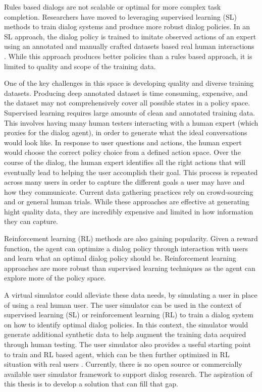 Rules based dialogs are not scalable or optimal for more complex task completion. Researchers have moved to leveraging supervised learning (SL) methods to train dialog systems and produce more robust dialog policies. In an SL approach, the dialog policy is trained to imitate observed actions of an expert using an annotated and manually crafted datasets based real human interactions \cite{Schatzmann2006ASO}. While this approach produces better policies than a rules based approach, it is limited to quality and scope of the training data. 

One of the key challenges in this space is developing quality and diverse training datasets. Producing deep annotated dataset is time consuming, expensive, and the dataset may not comprehensively cover all possible states in a policy space. Supervised learning requires large amounts of clean and annotated training data. This involves having many human testers interacting with a human expert (which proxies for the dialog agent), in order to generate what the ideal conversations would look like. In response to user questions and actions, the human expert would choose the correct policy choice from a defined action space. Over the course of the dialog, the human expert identifies all the right actions that will eventually lead to helping the user accomplish their goal. This process is repeated across many users in order to capture the different goals a user may have and how they communicate. Current data gathering practices rely on crowd-sourcing and or general human trials. While these approaches are effective at generating hight quality data, they are incredibly expensive and limited in how information they can capture.  

Reinforcement learning (RL) methods are also gaining popularity. Given a reward function, the agent can optimize a dialog policy through interaction with users and learn what an optimal dialog policy should be. Reinforcement learning approaches are more robust than supervised learning techniques as the agent can explore more of the policy space.

A virtual simulator could alleviate these data needs, by simulating a user in place of using a real human user. The user simulator can be used in the context of supervised learning (SL) or reinforcement learning (RL) to train a dialog system on how to identify optimal dialog policies. In this context, the simulator would generate additional synthetic data to help augment the training data acquired through human testing. The user simulator also provides a useful starting point to train and RL based agent, which can be then further optimized in RL situation with real users \cite{li_usersim}. Currently, there is no open source or commercially available user simulator framework to support dialog research. The aspiration of this thesis is to develop a solution that can fill that gap. 

